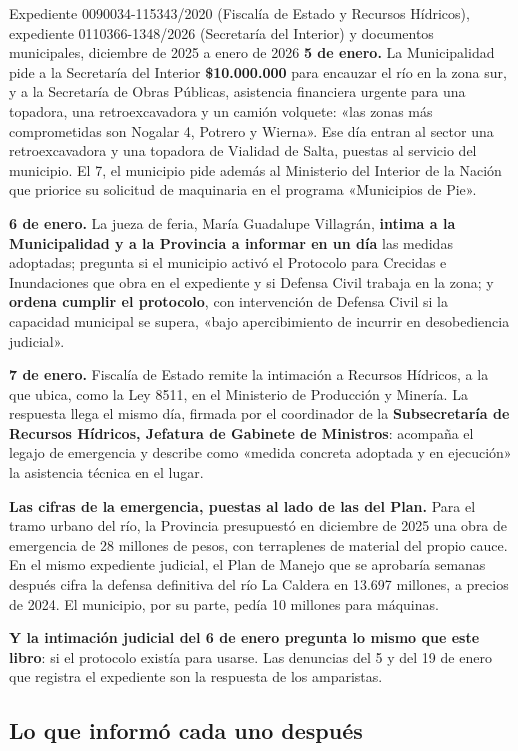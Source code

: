 \begin{ficha}{Expediente 0090034-115343/2020 (Fiscalía de Estado y Recursos Hídricos), expediente 0110366-1348/2026 (Secretaría del Interior) y documentos municipales, diciembre de 2025 a enero de 2026}
\textbf{5 de enero.} La Municipalidad pide a la Secretaría del Interior \textbf{\$10.000.000} para encauzar el río en la zona sur, y a la Secretaría de Obras Públicas, asistencia financiera urgente para una topadora, una retroexcavadora y un camión volquete: «las zonas más comprometidas son Nogalar 4, Potrero y Wierna». Ese día entran al sector una retroexcavadora y una topadora de Vialidad de Salta, puestas al servicio del municipio. El 7, el municipio pide además al Ministerio del Interior de la Nación que priorice su solicitud de maquinaria en el programa «Municipios de Pie».

\textbf{6 de enero.} La jueza de feria, María Guadalupe Villagrán, \textbf{intima a la Municipalidad y a la Provincia a informar en un día} las medidas adoptadas; pregunta si el municipio activó el Protocolo para Crecidas e Inundaciones que obra en el expediente y si Defensa Civil trabaja en la zona; y \textbf{ordena cumplir el protocolo}, con intervención de Defensa Civil si la capacidad municipal se supera, «bajo apercibimiento de incurrir en desobediencia judicial».

\textbf{7 de enero.} Fiscalía de Estado remite la intimación a Recursos Hídricos, a la que ubica, como la Ley 8511, en el Ministerio de Producción y Minería. La respuesta llega el mismo día, firmada por el coordinador de la \textbf{Subsecretaría de Recursos Hídricos, Jefatura de Gabinete de Ministros}: acompaña el legajo de emergencia y describe como «medida concreta adoptada y en ejecución» la asistencia técnica en el lugar.
\end{ficha}

\begin{cautela}
\textbf{Las cifras de la emergencia, puestas al lado de las del Plan.} Para el tramo urbano del río, la Provincia presupuestó en diciembre de 2025 una obra de emergencia de 28 millones de pesos, con terraplenes de material del propio cauce. En el mismo expediente judicial, el Plan de Manejo que se aprobaría semanas después cifra la defensa definitiva del río La Caldera en 13.697 millones, a precios de 2024. El municipio, por su parte, pedía 10 millones para máquinas.

\textbf{Y la intimación judicial del 6 de enero pregunta lo mismo que este libro}: si el protocolo existía para usarse. Las denuncias del 5 y del 19 de enero que registra el expediente son la respuesta de los amparistas.
\end{cautela}

\subsection*{Lo que informó cada uno después}

